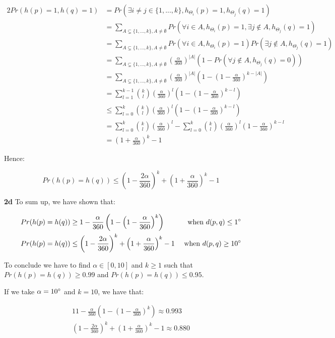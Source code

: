 \documentclass[10pt,a4paper]{article}
\theoremstyle{plain}
\begin{document}
\begin{alignat*}{2}
Pr(h(p) = 1, h(q) = 1) & = Pr(\exists i \neq j \in \{1, ..., k\}, h_{\Theta_i}(p) = 1, h_{\Theta_j}(q) = 1) \\
& = \sum_{A \subsetneq \{1, ..., k\}, A \neq \emptyset}{Pr(\forall i \in A, h_{\Theta_i}(p) = 1, \exists j \not \in A, h_{\Theta_j}(q) = 1)} \\
& = \sum_{A \subsetneq \{1, ..., k\}, A \neq \emptyset}{Pr(\forall i \in A, h_{\Theta_i}(p) = 1)Pr(\exists j \not \in A, h_{\Theta_j}(q) = 1)} \\
& = \sum_{A \subsetneq \{1, ..., k\}, A \neq \emptyset}{\left(\frac{\alpha}{360}\right)^{|A|}(1 - Pr(\forall j \not \in A, h_{\Theta_j}(q) = 0))} \\
& = \sum_{A \subsetneq \{1, ..., k\}, A \neq \emptyset}{\left(\frac{\alpha}{360}\right)^{|A|}\left(1 - \left(1 - \frac{\alpha}{360}\right)^{k-|A|}\right)} \\
& = \sum_{l = 1}^{k-1}{{k \choose l}\left(\frac{\alpha}{360}\right)^{l}\left(1 - \left(1 - \frac{\alpha}{360}\right)^{k-l}\right)} \\
& \leq \sum_{l = 0}^{k}{{k \choose l}\left(\frac{\alpha}{360}\right)^{l}\left(1 - \left(1 - \frac{\alpha}{360}\right)^{k-l}\right)} \\
& = \sum_{l = 0}^{k}{{k \choose l}\left(\frac{\alpha}{360}\right)^{l}} - \sum_{l = 0}^{k}{{k \choose l}\left(\frac{\alpha}{360}\right)^{l}\left(1 - \frac{\alpha}{360}\right)^{k-l}} \\
& = \left(1 + \frac{\alpha}{360}\right)^{k} - 1
\end{alignat*}

Hence:

$$Pr(h(p) = h(q)) \leq \left(1 - \frac{2\alpha}{360}\right)^k + \left(1 + \frac{\alpha}{360}\right)^{k} - 1
$$

\textbf{2d} To sum up, we have shown that:

\begin{alignat*}{3}
Pr(h(p) = h(q)) & \geq 1 - \frac{\alpha}{360}\left(1 - \left(1 - \frac{\alpha}{360}\right)^k\right) & \text{ when } d(p, q) \leq 1\degree \\
Pr(h(p) = h(q)) & \leq \left(1 - \frac{2\alpha}{360}\right)^k + \left(1 + \frac{\alpha}{360}\right)^{k} -  1 & \text{ when } d(p, q) \geq 10\degree \\
\end{alignat*}

To conclude we have to find $\alpha \in [0, 10]$ and $k \geq 1$ such that $Pr(h(p) = h(q)) \geq 0.99$ and $Pr(h(p) = h(q)) \leq 0.95$.

If we take $\alpha = 10\degree$ and $k = 10$, we have that:

\begin{alignat*}{1}
1 - \frac{\alpha}{360}\left(1 - \left(1 - \frac{\alpha}{360}\right)^k\right) \approx 0.993 \\
\left(1 - \frac{2\alpha}{360}\right)^k + \left(1 + \frac{\alpha}{360}\right)^{k} -  1 \approx 0.880 \\
\end{alignat*}
\end{document}

